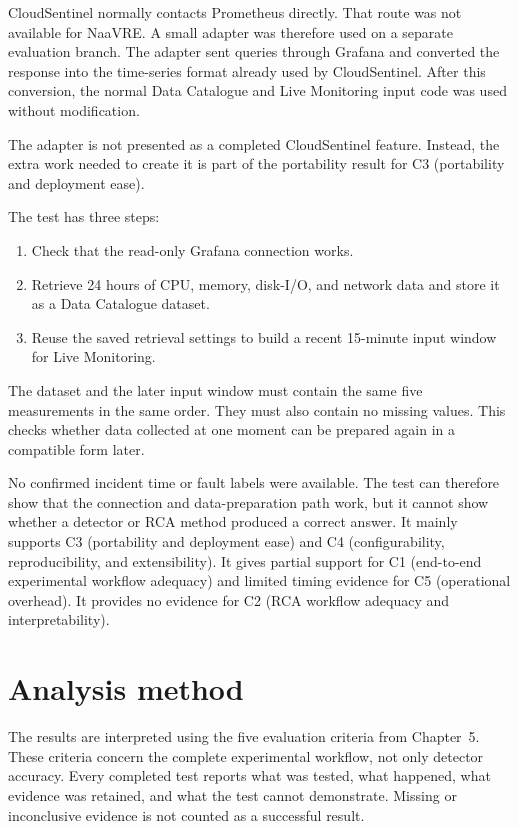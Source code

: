 CloudSentinel normally contacts Prometheus directly. That route was not available for NaaVRE. A small adapter was therefore used on a separate evaluation branch. The adapter sent queries through Grafana and converted the response into the time-series format already used by CloudSentinel. After this conversion, the normal Data Catalogue and Live Monitoring input code was used without modification.

The adapter is not presented as a completed CloudSentinel feature. Instead, the extra work needed to create it is part of the portability result for C3 (portability and deployment ease).

The test has three steps:
\begin{enumerate}
    \item Check that the read-only Grafana connection works.
    \item Retrieve 24 hours of CPU, memory, disk-I/O, and network data and store it as a Data Catalogue dataset.
    \item Reuse the saved retrieval settings to build a recent 15-minute input window for Live Monitoring.
\end{enumerate}

The dataset and the later input window must contain the same five measurements in the same order. They must also contain no missing values. This checks whether data collected at one moment can be prepared again in a compatible form later.

No confirmed incident time or fault labels were available. The test can therefore show that the connection and data-preparation path work, but it cannot show whether a detector or RCA method produced a correct answer. It mainly supports C3 (portability and deployment ease) and C4 (configurability, reproducibility, and extensibility). It gives partial support for C1 (end-to-end experimental workflow adequacy) and limited timing evidence for C5 (operational overhead). It provides no evidence for C2 (RCA workflow adequacy and interpretability).

\section{Analysis method}
The results are interpreted using the five evaluation criteria from Chapter~5. These criteria concern the complete experimental workflow, not only detector accuracy. Every completed test reports what was tested, what happened, what evidence was retained, and what the test cannot demonstrate. Missing or inconclusive evidence is not counted as a successful result.

